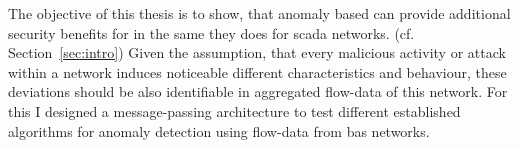 
\begin{comment}
\begin{itemize}
	\item experiment
	\item test data captured from a floor section of the computer science building
	\item enriched with malicious packets to keep consistent
	
	\item (focusses only an purpose based) attack classes (cf. \parencite{Uma2013})
		\subitem \gls{dos}
			\subsubitem Short circuit -> blackout on entire line
			\subsubitem flooding of \code{A\_Restart} telegrams
			\subsubitem flooding nonsense
		\subitem replay
			\subsubitem repeating a time window
			\subsubitem sniff a tag and repeat it compressed??? \alert{whatever this means?}
			\subsubitem do inverse action
		\subitem manipulation/reconfiguration
			\subsubitem telegram manipulation
			\subsubitem reconfiguration of devices (Access Attack)
			\subsubitem reconfigure line couplers/make them useless (Access Attack)
		\subitem spoofing 
		\subitem Reconnaissance Attack
			\subsubitem network mapping
			
		\subitem 
	
	\item aim is to show if attacks can be identified by anomaly detection on flow data
		\subitem under the assumption, that attacks noticeable alter the characteristic and behaviour of \gls{knx} traffic
		\subitem cf. \parencite{Mukherjee1994,Yang2006,Pan2014}
	\item demonstrate a message-passing architecture to perform online analytics on \gls{knx} flow-data
	\item benchmark different algorithms against each other
\end{itemize}
\end{comment}

The objective of this thesis is to show, that anomaly based  can provide additional security benefits for  in the same they does for \gls{scada} networks. (cf. Section~\ref{sec:intro})
Given the assumption, that every malicious activity or attack within a network induces noticeable different characteristics and behaviour, these deviations should be also identifiable in aggregated flow-data of this network. \parencite[cf.][]{Mukherjee1994,Yang2006,Pan2014}
For this I designed a message-passing architecture to test different established algorithms for anomaly detection using flow-data from \gls{bas} networks.

